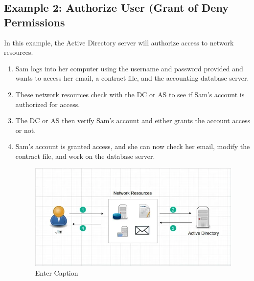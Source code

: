 \subsection{Example 2: Authorize User (Grant of Deny Permissions}
In this example, the Active Directory server will authorize access to network resources.
\begin{enumerate}
    \item Sam logs into her computer using the username and password provided and wants to access her email, a contract file, and the accounting database server.
    \item These network resources check with the DC or AS to see if Sam's account is authorized for access.
    \item The DC or AS then verify Sam's account and either grants the account access or not.
    \item Sam's account is granted access, and she can now check her email, modify the contract file, and work on the database server.
    \begin{figure}
        \centering
        \includegraphics[width=0.75\linewidth]{authorization.png}
        \caption{Enter Caption}
        \label{fig:placeholder}
    \end{figure}
\end{enumerate}


